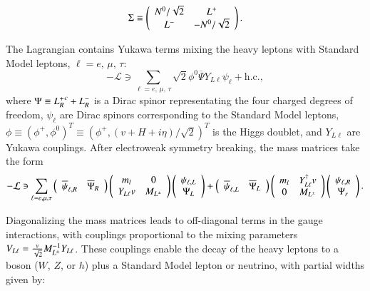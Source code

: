 \begin{equation}
	\Sigma\equiv \left(\begin{array}{cc} N^{0}/\sqrt{2} & L^{+} \\ L^{-} & -N^{0}/\sqrt{2}\end{array}\right).
\end{equation}

The Lagrangian contains Yukawa terms mixing the heavy leptons with Standard Model leptons, $\ell=e,\,\mu,\,\tau$:
\begin{equation}
  -\mathcal{L} \ni \sum_{\ell=e,\,\mu,\,\tau} \sqrt{2}\phi^0 \overline{\Psi} Y_{L \ell} \psi_{\ell} + \mathrm{h.c.},
\end{equation}
where $\Psi\equiv {\ensuremath{L^{+}}_R}^c + L^{-}_R$ is a Dirac spinor representating the four charged degrees of freedom, $\psi_{\ell}$ are Dirac spinors corresponding to the Standard Model leptons, $\phi\equiv(\phi^+,\phi^0)^T\equiv (\phi^+,(v+H+i\eta)/\sqrt{2})^T$ is the Higgs doublet, and $Y_{L \ell}$ are Yukawa couplings. After electroweak symmetry breaking, the mass matrices take the form
\begin{equation}
-\mathcal{L} \ni \sum_{\ell=e,\mu,\tau} \left(\begin{array}{cc}\overline{\psi}_{\ell,R} & \overline{\Psi}_R \end{array} \right) \left(\begin{array}{cc} m_l & 0 \\ Y_{L \ell}v & M_{\lpm} \end{array}\right) \left(\begin{array}{c} \psi_{\ell,L} \\ \Psi_L \end{array}\right)  + \left(\begin{array}{cc}\overline{\psi}_{\ell,L} & \overline{\Psi}_L\end{array}\right) \left(\begin{array}{cc} m_l & Y_{L \ell}^{\dagger}v \\ 0 & M_{\lpm} \end{array}\right) \left(\begin{array}{c} \psi_{\ell,R} \\ \Psi_r \end{array}\right).
\end{equation}

Diagonalizing the mass matrices leads to off-diagonal terms in the gauge interactions, with couplings proportional to the mixing parameters $V_{L\ell}=\frac{v}{\sqrt{2}} M_{L^{\pm}}^{-1} Y_{L \ell}$. These couplings enable the decay of the heavy leptons to a boson ($W$, $Z$, or $h$) plus a Standard Model lepton or neutrino, with partial widths given by:

